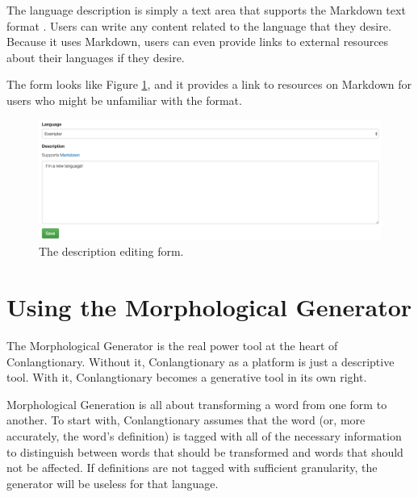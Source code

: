 The language description is simply a text area that supports the Markdown text format \cite{Markdown}. Users can write any content related to the language that they desire. Because it uses Markdown, users can even provide links to external resources about their languages if they desire.

The form looks like Figure \ref{fig:edit-description}, and it provides a link to resources on Markdown for users who might be unfamiliar with the format.

\begin{figure}[h]
\includegraphics[width=\textwidth]{figures/edit-description}
\caption{The description editing form.}
\centering
\label{fig:edit-description}
\end{figure}

\section{Using the Morphological Generator}
\label{sec:using-morph-gen}

The Morphological Generator is the real power tool at the heart of Conlangtionary. Without it, Conlangtionary as a platform is just a descriptive tool. With it, Conlangtionary becomes a generative tool in its own right.

Morphological Generation is all about transforming a word from one form to another. To start with, Conlangtionary assumes that the word (or, more accurately, the word's definition) is tagged with all of the necessary information to distinguish between words that should be transformed and words that should not be affected. If definitions are not tagged with sufficient granularity, the generator will be useless for that language.

